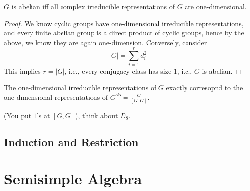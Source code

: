 \documentclass[openany]{book}
\begin{document}
\begin{prop}
    $G$ is abelian iff all complex irreducible representations of $G$ are one-dimensional.
\end{prop}
\begin{proof}
    We know cyclic groups have one-dimensional irreducible representations, and every finite abelian group is a direct product of cyclic groups, hence by the above, we know they are again one-dimension. Conversely, consider 
    \begin{equation*}
        |G|=\sum_{i=1}^rd_i^2
    \end{equation*}
    This implies $r=|G|$, i.e., every conjugacy class has size $1$, i.e., $G$ is abelian.
\end{proof}

\begin{prop}
    The one-dimensional irreducible representations of $G$ exactly corresopnd to the one-dimensional representations of $G^{\text{ab}}=\frac{G}{[G:G]}$. 
    
    (You put $1$'s at $[G,G]$), think about $D_8$.
\end{prop}







\section{Induction and Restriction}




























\chapter{Semisimple Algebra}


\newpage
\end{document}
